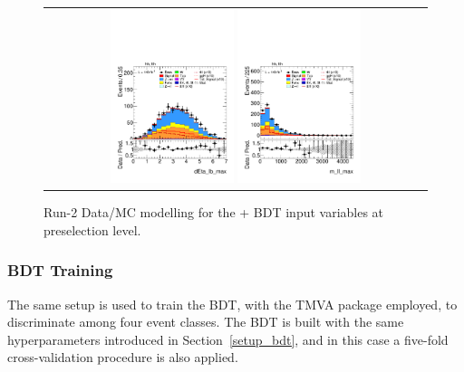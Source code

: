 \begin{figure}[htbp]
\begin{tabular}{@{}c c c@{}}
    \multicolumn{3}{c}{%
      \includegraphics[width=0.33\textwidth]{images/plots_modelling_run2_run3_variables/run_2_tth/plot_dEta_lb_max_hh_tth_15_16_17_18.pdf}%
      \hspace{1.5pt}%
      \includegraphics[width=0.33\textwidth]{images/plots_modelling_run2_run3_variables/run_2_tth/plot_m_ll_max_hh_tth_15_16_17_18.pdf}%
    }\\
  \end{tabular}

  \caption{Run-2 Data/MC modelling for the \thqb + \ttH BDT input variables at preselection level.}
  \label{tth_vars_modelling_run2_3}
\end{figure}

\FloatBarrier
\subsubsection*{BDT Training }

The same setup is used to train the BDT, with the \textsc{TMVA} package employed, to discriminate among four event classes. The BDT is built with the same hyperparameters introduced in Section~\ref{setup_bdt}, and in this case a five-fold cross-validation procedure is also applied.


